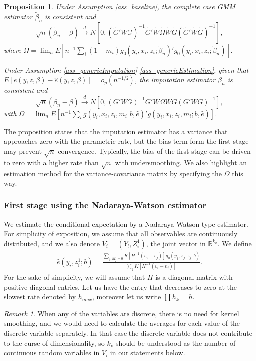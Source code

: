 \documentclass{article}
\newtheorem{proposition}{Proposition}
\theoremstyle{definition}
\theoremstyle{remark}
\newtheorem{remark}{Remark}
\begin{document}
\begin{proposition}\label{prop_asympTheory}
	Under Assumption \ref{ass_baseline}, the complete case GMM estimator $\tilde{\beta}_n$ is consistent and
	\[\sqrt{n}(\tilde{\beta}_n-\beta) \stackrel{d}{\rightarrow} N[0, (\tilde{G}'W\tilde{G})^{-1}\tilde{G}'\tilde{W} \tilde{\Omega} \tilde{W} \tilde{G} (\tilde{G}'\tilde{W}\tilde{G})^{-1}],
	\]	
	where $\tilde{\Omega} = \lim_n E\left[n^{-1}\sum_i (1-m_i)g_0(y_i,x_i,z_i; \tilde{\beta}_n)'g_0(y_i,x_i,z_i; \tilde{\beta}_n)\right].$
	
	Under Assumption \ref{ass_genericImputation}-\ref{ass_genericEstimation}, given that $E[e(y, z,\beta)-\hat{e}(y,z,\beta)]=o_p(n^{-1/2})$, the imputation estimator $\beta_n$ is consistent and
	\[\sqrt{n}(\beta_n-\beta) \stackrel{d}{\rightarrow} N[0, (G'WG)^{-1}G'W \Omega W G (G'WG)^{-1}],
	\]
	with $\Omega= \lim_n E\left[n^{-1}\sum_i g(y_i,x_i,z_i,m_i; b , \hat{e})'g(y_i,x_i,z_i,m_i; b , \hat{e})\right]$.
\end{proposition}

The proposition states that the imputation estimator has a variance that approaches zero with the parametric rate, but the bias term form the first stage may prevent $\sqrt{n}$-convergence. Typically, the bias of the first stage can be driven to zero with a higher rate than $\sqrt{n}$ with undersmoothing. We also highlight an estimation method for the variance-covariance matrix by specifying the $\Omega$ this way.

\subsubsection{First stage using the Nadaraya-Watson estimator}
We estimate the conditional expectation by a Nadaraya-Watson type estimator. For simplicity of exposition, we assume that all observables are continuously distributed, and we also denote $V_i = (Y_i, Z_i^1)$, the joint vector in $\mathbb{R}^{k_v}$. We define
\begin{align}
\hat{e}(y_i, z_i^1; b)= \frac{\sum_{j: M_j=0} K[H^{-1}(v_i-v_j)] g_0(y_j, x_j, z_j, b)}{\sum_j K[H^{-1}(v_i-v_j)]}.
\end{align}
For the sake of simplicity, we will assume that $H$ is a diagonal matrix with positive diagonal entries. Let us have the entry that decreases to zero at the slowest rate denoted by $h_{max}$, moreover let us write $\prod h_k= h$.

\begin{remark}
	When any of the variables are discrete, there is no need for kernel smoothing, and we would need to calculate the averages for each value of the discrete variable separately. In that case the discrete variable does not contribute to the curse of dimensionality, so $k_v$ should be understood as the number of continuous random variables in $V_i$ in our statements below.
\end{remark}
\end{document}
